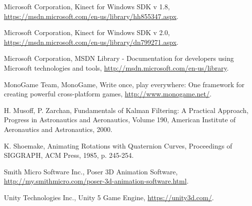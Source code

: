 \documentclass[a4paper, 12pt]{amsart}
\begin{document}
\begin{thebibliography}{10}
Microsoft Corporation, Kinect for Windows SDK v 1.8, \url{https://msdn.microsoft.com/en-us/library/hh855347.aspx}.

Microsoft Corporation, Kinect for Windows SDK v 2.0, \url{https://msdn.microsoft.com/en-us/library/dn799271.aspx}.

Microsoft Corporation, MSDN Library - Documentation for developers using Microsoft technologies and tools, \url{http://msdn.microsoft.com/en-us/library}.

MonoGame Team, MonoGame, Write once, play everywhere: One framework for creating powerful cross-platform games, \url{http://www.monogame.net/}.

H. Musoff, P. Zarchan, Fundamentals of Kalman Filtering: A Practical Approach, Progress in Astronautics and Aeronautics, Volume 190, American Institute of Aeronautics and Astronautics, 2000.

K. Shoemake, Animating Rotations with Quaternion Curves, Proceedings of SIGGRAPH, ACM Press, 1985, p. 245-254.

Smith Micro Software Inc., Poser 3D Animation Software, \url{http://my.smithmicro.com/poser-3d-animation-software.html}.

Unity Technologies Inc., Unity 5 Game Engine, \url{https://unity3d.com/}.

\end{thebibliography}

\clearpage

\listoffigures


\end{document}
